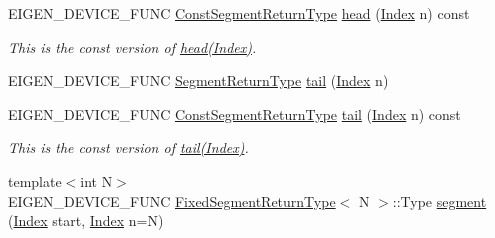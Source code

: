 \begin{DoxyCompactItemize}
\item 
\mbox{\label{class_eigen_1_1_sparse_matrix_base_a53e85c84714175782fb701934f30bef4}} 
E\+I\+G\+E\+N\+\_\+\+D\+E\+V\+I\+C\+E\+\_\+\+F\+U\+NC \mbox{\hyperlink{class_eigen_1_1_vector_block}{Const\+Segment\+Return\+Type}} \mbox{\hyperlink{class_eigen_1_1_sparse_matrix_base_a53e85c84714175782fb701934f30bef4}{head}} (\mbox{\hyperlink{struct_eigen_1_1_eigen_base_a554f30542cc2316add4b1ea0a492ff02}{Index}} n) const
\begin{DoxyCompactList}\small\item\em This is the const version of \mbox{\hyperlink{class_eigen_1_1_sparse_matrix_base_a6b3f24af4a70e2824a52fbe909872274}{head(\+Index)}}. \end{DoxyCompactList}\item 
E\+I\+G\+E\+N\+\_\+\+D\+E\+V\+I\+C\+E\+\_\+\+F\+U\+NC \mbox{\hyperlink{class_eigen_1_1_vector_block}{Segment\+Return\+Type}} \mbox{\hyperlink{class_eigen_1_1_sparse_matrix_base_a381e2efeb1531223bbb318b1ac5c5090}{tail}} (\mbox{\hyperlink{struct_eigen_1_1_eigen_base_a554f30542cc2316add4b1ea0a492ff02}{Index}} n)
\item 
\mbox{\label{class_eigen_1_1_sparse_matrix_base_ac6a7688d302a0bd248e5bf1aa7f37e10}} 
E\+I\+G\+E\+N\+\_\+\+D\+E\+V\+I\+C\+E\+\_\+\+F\+U\+NC \mbox{\hyperlink{class_eigen_1_1_vector_block}{Const\+Segment\+Return\+Type}} \mbox{\hyperlink{class_eigen_1_1_sparse_matrix_base_ac6a7688d302a0bd248e5bf1aa7f37e10}{tail}} (\mbox{\hyperlink{struct_eigen_1_1_eigen_base_a554f30542cc2316add4b1ea0a492ff02}{Index}} n) const
\begin{DoxyCompactList}\small\item\em This is the const version of \mbox{\hyperlink{class_eigen_1_1_sparse_matrix_base_a381e2efeb1531223bbb318b1ac5c5090}{tail(\+Index)}}. \end{DoxyCompactList}\item 
{\footnotesize template$<$int N$>$ }\\E\+I\+G\+E\+N\+\_\+\+D\+E\+V\+I\+C\+E\+\_\+\+F\+U\+NC \mbox{\hyperlink{struct_eigen_1_1_sparse_matrix_base_1_1_fixed_segment_return_type}{Fixed\+Segment\+Return\+Type}}$<$ N $>$\+::Type \mbox{\hyperlink{class_eigen_1_1_sparse_matrix_base_a1d27cc814e81dfab65901aa201a886ef}{segment}} (\mbox{\hyperlink{struct_eigen_1_1_eigen_base_a554f30542cc2316add4b1ea0a492ff02}{Index}} start, \mbox{\hyperlink{struct_eigen_1_1_eigen_base_a554f30542cc2316add4b1ea0a492ff02}{Index}} n=N)

\end{DoxyCompactItemize}
